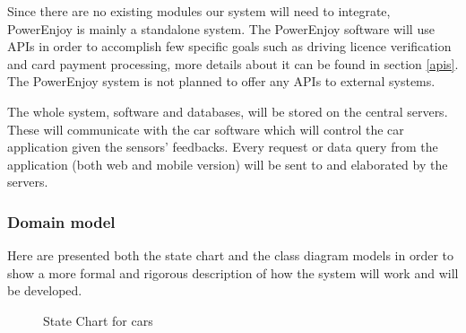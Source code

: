 \documentclass[english]{article}
\begin{document}
Since there are no existing modules our system will need to integrate, PowerEnjoy is mainly a standalone system.
The PowerEnjoy software will use APIs in order to accomplish few specific goals such as  driving licence verification and card payment processing, more details about it can be found in section \ref{apis}.
The PowerEnjoy system is not planned to offer any APIs to external systems.

The whole system, software and databases, will be stored on the central servers. These will communicate with the car software which will control the car application given the sensors' feedbacks.
Every request or data query from the application (both web and mobile version) will be sent to and elaborated by the servers.

\subsubsection{Domain model}

Here are presented both the state chart and the class diagram models in order to show a more formal and rigorous description of how the system will work and will be developed.

\begin{figure}[H]
	\centering
	\caption{State Chart for cars}
	\label{statechart}
\end{figure}
\end{document}
